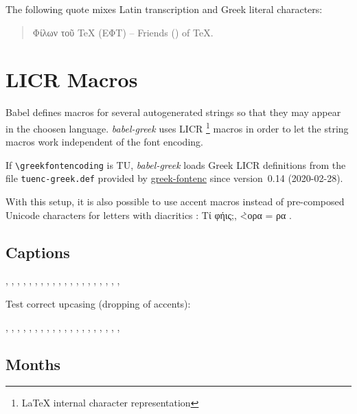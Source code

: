 \documentclass[a4paper]{article}
\begin{document}
The following quote mixes Latin transcription and Greek literal characters:

\begin{quote}
  \greekscript Φίλων τοῦ \textlatin{TeX} (ΕΦΤ) --
  \latintext Friends () of TeX.%
\end{quote}

\section{LICR Macros}

Babel defines macros for several autogenerated strings so that they may
appear in the choosen language. \emph{babel-greek} uses LICR%
\footnote{LaTeX internal character representation} macros in
order to let the string macros work independent of the font encoding.

If \verb|\greekfontencoding| is TU, \emph{babel-greek} loads Greek LICR
definitions from the file \texttt{tuenc-greek.def} provided by
\href{http://www.ctan.org/pkg/greek-fontenc}{greek-fontenc}
since version~0.14 (2020-02-28).

With this setup, it is also possible to use accent macros instead of
pre-composed Unicode characters for letters with diacritics%
\ifdefined \UnicodeEncodingName
  : Τ\'ι φ\'ηις;, \`<ορα = ρα
\fi
.

\subsection{Captions}

\prefacename,
\refname,
\abstractname,
\bibname,
\chaptername,
\appendixname,
\contentsname,
\listfigurename ,
\listtablename,
\indexname,
\figurename,
\tablename,
\partname,
\enclname,
\ccname,
\headtoname,
\pagename,
\seename,
\alsoname,
\proofname,
\glossaryname
{}

Test correct upcasing (dropping of accents):

\MakeUppercase{
\prefacename,
\refname,
\abstractname,
\bibname,
\chaptername,
\appendixname,
\contentsname,
\listfigurename,
\listtablename,
\indexname,
\figurename,
\tablename,
\partname,
\enclname,
\ccname,
\headtoname,
\pagename,
\seename,
\alsoname,
\proofname,
\glossaryname
}


\subsection{Months}
\end{document}
